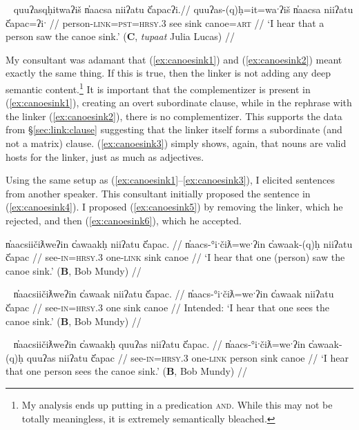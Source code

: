 \ex~ \label{ex:canoesink3}
\begingl
\glpreamble quuʔasqḥitwaʔiš n̓aacsa niiʔatu č̓apacʔi.//
\gla quuʔas-(q)ḥ=it=waˑʔiš n̓aacsa niiʔatu č̓apac=ʔiˑ //
\glb person-\textsc{link}=\textsc{pst}=\textsc{hrsy.3} see sink canoe=\textsc{art} //
\glft `I hear that a person saw the canoe sink.' (\textbf{C}, \textit{tupaat} Julia Lucas) //
\endgl
\xe

My consultant was adamant that (\ref{ex:canoesink1}) and (\ref{ex:canoesink2}) meant exactly the same thing. If this is true, then the linker is not adding any deep semantic content.\footnote{My analysis ends up putting in a predication \textsc{and}. While this may not be totally meaningless, it is extremely semantically bleached.} It is important that the complementizer is present in (\ref{ex:canoesink1}), creating an overt subordinate clause, while in the rephrase with the linker (\ref{ex:canoesink2}), there is no complementizer. This supports the data from \S\ref{sec:link:clause} suggesting that the linker itself forms a subordinate (and not a matrix) clause. (\ref{ex:canoesink3}) simply shows, again, that nouns are valid hosts for the linker, just as much as adjectives.

Using the same setup as (\ref{ex:canoesink1}--\ref{ex:canoesink3}), I elicited sentences from another speaker. This consultant initially proposed the sentence in (\ref{ex:canoesink4}). I proposed (\ref{ex:canoesink5}) by removing the linker, which he rejected, and then (\ref{ex:canoesink6}), which he accepted.

\ex \label{ex:canoesink4}
\begingl
\glpreamble n̓aacsiičiƛweʔin c̓awaakḥ niiʔatu č̓apac. //
\gla n̓aacs-°iˑčiƛ=weˑʔin c̓awaak-(q)ḥ niiʔatu č̓apac //
\glb see-\textsc{in}=\textsc{hrsy.3} one-\textsc{link} sink canoe //
\glft `I hear that one (person) saw the canoe sink.' (\textbf{B}, Bob Mundy) //
\endgl
\xe

\ex~ \label{ex:canoesink5}
\begingl
\glpreamble *n̓aacsiičiƛweʔin c̓awaak niiʔatu č̓apac. //
\gla n̓aacs-°iˑčiƛ=weˑʔin c̓awaak niiʔatu č̓apac //
\glb see-\textsc{in}=\textsc{hrsy.3} one sink canoe //
\glft Intended: `I hear that one sees the canoe sink.' (\textbf{B}, Bob Mundy) //
\endgl
\xe

\ex~ \label{ex:canoesink6}
\begingl
\glpreamble n̓aacsiičiƛweʔin c̓awaakḥ quuʔas niiʔatu č̓apac. //
\gla n̓aacs-°iˑčiƛ=weˑʔin c̓awaak-(q)ḥ quuʔas niiʔatu č̓apac //
\glb see-\textsc{in}=\textsc{hrsy.3} one-\textsc{link} person sink canoe //
\glft `I hear that one person sees the canoe sink.' (\textbf{B}, Bob Mundy) //
\endgl
\xe


